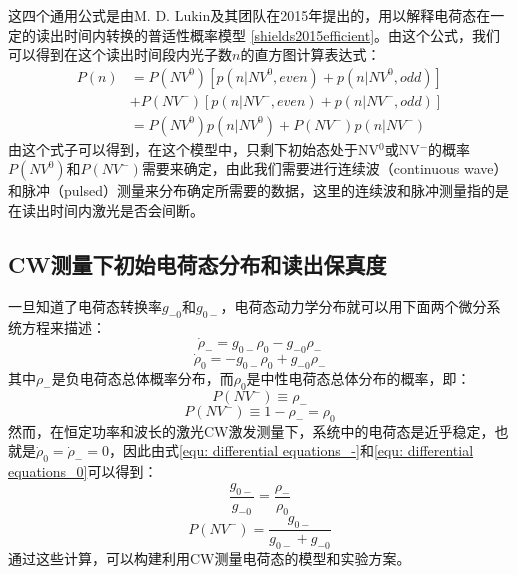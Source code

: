 \documentclass[type = bachelor]{whu-thesis}
\begin{document}
这四个通用公式是由M. D. Lukin及其团队在2015年提出的，用以解释电荷态在一定的读出时间内转换的普适性概率模型 \ref{shields2015efficient}。由这个公式，我们可以得到在这个读出时间段内光子数$n$的直方图计算表达式：
\begin{equation}
  \begin{aligned}
    P(n)&=P(NV^0)[p(n|NV^0,even)+p(n|NV^0,odd)] \\
    &+P(NV^-)[p(n|NV^-,even)+p(n|NV^-,odd)] \\
    &=P(NV^0)p(n|NV^0)+P(NV^-)p(n|NV^-)
  \end{aligned}
\end{equation}
由这个式子可以得到，在这个模型中，只剩下初始态处于NV$^0$或NV$^-$的概率$P(NV^0)$和$P(NV^-)$需要来确定，由此我们需要进行连续波（continuous wave）和脉冲（pulsed）测量来分布确定所需要的数据，这里的连续波和脉冲测量指的是在读出时间内激光是否会间断。

\subsection{CW测量下初始电荷态分布和读出保真度}
一旦知道了电荷态转换率$g_{-0}$和$g_{0-}$，电荷态动力学分布就可以用下面两个微分系统方程来描述：
\begin{equation}
  \dot{\rho}_- = g_{0-}\rho_0-g_{-0}\rho_-
  \label{equ: differential equations_-}
\end{equation}
\begin{equation}
  \dot{\rho}_0 = -g_{0-}\rho_0+g_{-0}\rho_-
  \label{equ: differential equations_0}
\end{equation}
其中$\rho_-$是负电荷态总体概率分布，而$\rho_0$是中性电荷态总体分布的概率，即：
\begin{equation}
  P(NV^-) \equiv \rho_-
\end{equation}
\begin{equation}
  P(NV^-) \equiv 1-\rho_- = \rho_0
\end{equation}
然而，在恒定功率和波长的激光CW激发测量下，系统中的电荷态是近乎稳定，也就是$\dot{\rho}_0 = \dot{\rho}_- = 0$，因此由式\ref{equ: differential equations_-}和\ref{equ: differential equations_0}可以得到：
\begin{equation}
  \frac{g_{0-}}{g_{-0}}=\frac{\rho_-}{\rho_0}
\end{equation}
\begin{equation}
  P(NV^-)=\frac{g_{0-}}{g_{0-}+g_{-0}}
\end{equation}
通过这些计算，可以构建利用CW测量电荷态的模型和实验方案。
\end{document}
